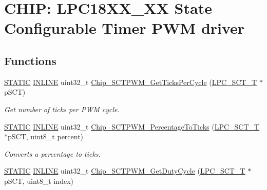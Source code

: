 \hypertarget{group___s_c_t___p_w_m__18_x_x__43_x_x}{}\section{C\+H\+IP\+: L\+P\+C18\+X\+X\+\_\+XX State Configurable Timer P\+WM driver}
\label{group___s_c_t___p_w_m__18_x_x__43_x_x}
\subsection*{Functions}
\begin{DoxyCompactItemize}
\item 
\hyperlink{group___l_p_c___types___public___macros_ga10b2d890d871e1489bb02b7e70d9bdfb}{S\+T\+A\+T\+IC} \hyperlink{spifi__18xx__43xx_8h_a2eb6f9e0395b47b8d5e3eeae4fe0c116}{I\+N\+L\+I\+NE} uint32\+\_\+t \hyperlink{group___s_c_t___p_w_m__18_x_x__43_x_x_ga6a111f1642326388361bcc2a251a502b}{Chip\+\_\+\+S\+C\+T\+P\+W\+M\+\_\+\+Get\+Ticks\+Per\+Cycle} (\hyperlink{struct_l_p_c___s_c_t___t}{L\+P\+C\+\_\+\+S\+C\+T\+\_\+T} $\ast$p\+S\+CT)
\begin{DoxyCompactList}\small\item\em Get number of ticks per P\+WM cycle. \end{DoxyCompactList}\item 
\hyperlink{group___l_p_c___types___public___macros_ga10b2d890d871e1489bb02b7e70d9bdfb}{S\+T\+A\+T\+IC} \hyperlink{spifi__18xx__43xx_8h_a2eb6f9e0395b47b8d5e3eeae4fe0c116}{I\+N\+L\+I\+NE} uint32\+\_\+t \hyperlink{group___s_c_t___p_w_m__18_x_x__43_x_x_gac04da455f98448bf1d582550935f3b47}{Chip\+\_\+\+S\+C\+T\+P\+W\+M\+\_\+\+Percentage\+To\+Ticks} (\hyperlink{struct_l_p_c___s_c_t___t}{L\+P\+C\+\_\+\+S\+C\+T\+\_\+T} $\ast$p\+S\+CT, uint8\+\_\+t percent)
\begin{DoxyCompactList}\small\item\em Converts a percentage to ticks. \end{DoxyCompactList}\item 
\hyperlink{group___l_p_c___types___public___macros_ga10b2d890d871e1489bb02b7e70d9bdfb}{S\+T\+A\+T\+IC} \hyperlink{spifi__18xx__43xx_8h_a2eb6f9e0395b47b8d5e3eeae4fe0c116}{I\+N\+L\+I\+NE} uint32\+\_\+t \hyperlink{group___s_c_t___p_w_m__18_x_x__43_x_x_ga26e3032074e4a05c9da08309d9614bcd}{Chip\+\_\+\+S\+C\+T\+P\+W\+M\+\_\+\+Get\+Duty\+Cycle} (\hyperlink{struct_l_p_c___s_c_t___t}{L\+P\+C\+\_\+\+S\+C\+T\+\_\+T} $\ast$p\+S\+CT, uint8\+\_\+t index)

\end{DoxyCompactItemize}
